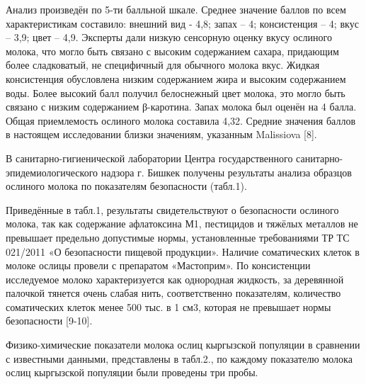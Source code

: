 \begin{multicols}{2}
Анализ произведён по 5-ти балльной шкале. Среднее значение баллов по
всем характеристикам составило: внешний вид - 4,8; запах -- 4;
консистенция -- 4; вкус -- 3,9; цвет -- 4,9. Эксперты дали низкую
сенсорную оценку вкусу ослиного молока, что могло быть связано с высоким
содержанием сахара, придающим более сладковатый, не специфичный для
обычного молока вкус. Жидкая консистенция обусловлена низким содержанием
жира и высоким содержанием воды. Более высокий балл получил белоснежный
цвет молока, это могло быть связано с низким содержанием β-каротина.
Запах молока был оценён на 4 балла. Общая приемлемость ослиного молока
составила 4,32. Средние значения баллов в настоящем исследовании близки
значениям, указанным Malissiova {[}8{]}.

В санитарно-гигиенической лаборатории Центра государственного
санитарно-эпидемиологического надзора г. Бишкек получены результаты
анализа образцов ослиного молока по показателям безопасности (табл.1).

Приведённые в табл.1, результаты свидетельствуют о безопасности ослиного
молока, так как содержание афлатоксина М1, пестицидов и тяжёлых металлов
не превышает предельно допустимые нормы, установленные требованиями ТР
ТС 021/2011 «О безопасности пищевой продукции». Наличие соматических
клеток в молоке ослицы провели с препаратом «Мастоприм». По консистенции
исследуемое молоко характеризуется как однородная жидкость, за
деревянной палочкой тянется очень слабая нить, соответственно
показателям, количество соматических клеток менее 500 тыс. в 1 см3,
которая не превышает нормы безопасности {[}9-10{]}.

Физико-химические показатели молока ослиц кыргызской популяции в
сравнении с известными данными, представлены в табл.2., по каждому
показателю молока ослиц кыргызской популяции были проведены три пробы.
\end{multicols}

\begin{table}[H]
\caption*{Таблица 2 - Химический состав исследуемого ослиного молока}
\centering
{}
\end{table}

